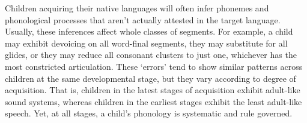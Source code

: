 \documentclass[lab={4},title={Phonetics of toddler speech},addfiller=true,turnin=false]{com310lab}
\begin{document}
\maketitle

\begin{overview}
	Children acquiring their native languages will often infer phonemes and phonological processes that aren't actually attested in the target language.
	Usually, these inferences affect whole classes of segments.
	For example, a child may exhibit devoicing on all word-final segments, they may substitute \ipa[w] for all glides, or they may reduce all consonant clusters to just one, whichever has the most constricted articulation.
	These `errors' tend to show similar patterns across children at the same developmental stage, but they vary according to degree of acquisition.
	That is, children in the latest stages of acquisition exhibit adult-like sound systems, whereas children in the earliest stages exhibit the least adult-like speech.
	Yet, at all stages, a child's phonology is systematic and rule governed.
\end{overview}
\end{document}
